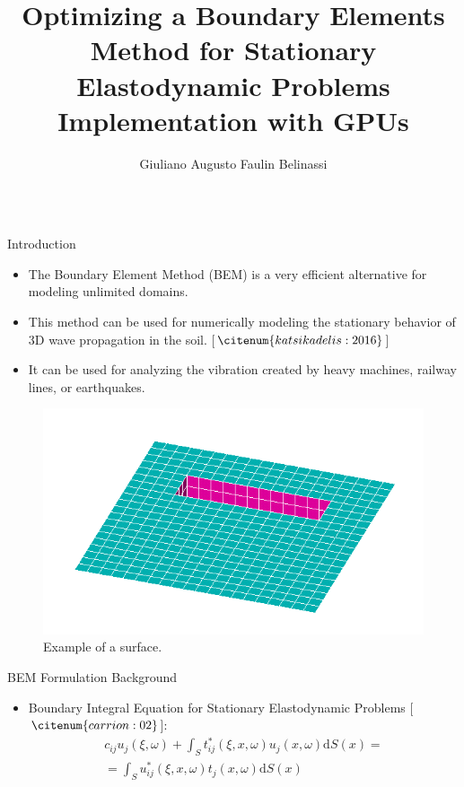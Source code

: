 \documentclass{beamer}
\author[giuliano.belinassi@usp.br]{Giuliano Augusto Faulin Belinassi}
\title{Optimizing a Boundary Elements Method for Stationary Elastodynamic Problems Implementation with GPUs}
\institute{Instituto de Matemática e Estatística - Universidade de São Paulo}
\begin{document}
\begin{frame}[fragile]\centering

\begin{columns}[T]

\begin{column}{.46\textwidth}

\begin{block}{Introduction}\justifying

\begin{itemize}

\item The Boundary Element Method (BEM) is a very efficient alternative for modeling unlimited domains.
\item This method can be used for numerically modeling the stationary behavior of 3D wave propagation in the soil. [$\citenum{katsikadelis:2016}$]
\item It can be used for analyzing the vibration created by heavy machines, railway lines, or earthquakes.

\end{itemize}

\vspace{0.5cm}

\begin{figure}
	\centering
	\includegraphics[scale=0.7]{trincheira.png}
	\caption{Example of a surface.}

\end{figure}

\end{block}

\begin{block}{BEM Formulation Background}\justifying

\begin{itemize}
\item Boundary Integral Equation for Stationary Elastodynamic Problems [$\citenum{carrion:02}$]:
\begin{equation}
\begin{split}
	c_{ij}u_{j}(\xi,\omega) + \int_S t_{ij}^*(\xi, x, \omega)u_j (x, \omega)\text{d}S(x) = \\
	= \int_S u_{ij}^*(\xi, x, \omega) t_j(x, \omega)\text{d}S(x) \label{bem_formulation} \nonumber
\end{split}
\end{equation}


\end{itemize}
\end{block}
\end{column}
\end{columns}
\end{frame}
\end{document}
